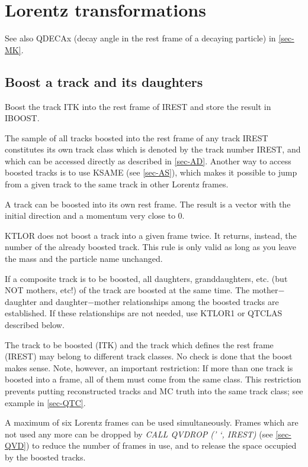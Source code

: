  
\section{\label{sec-QT}Lorentz transformations}
\par
See also QDECAx (decay angle in the rest frame of a decaying particle)
in \ref{sec-MK}.
\par
\subsection{\label{sec-QTL}Boost a track and its daughters}
\par
{}
\par
Boost the track ITK
into the rest frame of IREST and store the
result in IBOOST.
\par
The sample of all tracks boosted into the rest frame of any track
IREST
constitutes its own track class which is denoted by the track number
IREST, and which can be accessed directly as described in
\ref{sec-AD}. Another way to access
boosted tracks is to use KSAME (see
\ref{sec-AS}), which makes it possible to jump from a given track
to the same track in other Lorentz frames.
\par
A track can be boosted into its own rest frame. The
result is a vector with the initial direction and a momentum very
close to 0.
\par
KTLOR does not boost a track into a given frame twice. It returns,
instead, the number of the already boosted track. This rule is only
valid as long as you leave the mass and the particle name unchanged.
\par
If a composite track is to be boosted, all daughters, granddaughters,
etc. (but NOT mothers, etc!) of the track are boosted at the same
time.
The mother$-$daughter and daughter$-$mother relationships among the
boosted
tracks are established. If these relationships are not needed,
use KTLOR1 or QTCLAS described below.
\par
The track to be boosted (ITK) and the track which defines the rest
frame (IREST) may belong to different track classes. No check is done
that the boost makes sense. Note, however, an important restriction:
If more than one track is boosted into a frame, all of them must come
from the same class. This restriction prevents putting reconstructed
tracks and MC truth into the same track class; see example in
\ref{sec-QTC}.
\par
A maximum of six Lorentz
frames can be used simultaneously. Frames which
are not used any more can be dropped by
{\it CALL QVDROP (' `, IREST)} (see \ref{sec-QVD})
to reduce the number of frames in use, and to release
the space occupied by the boosted tracks.
 
